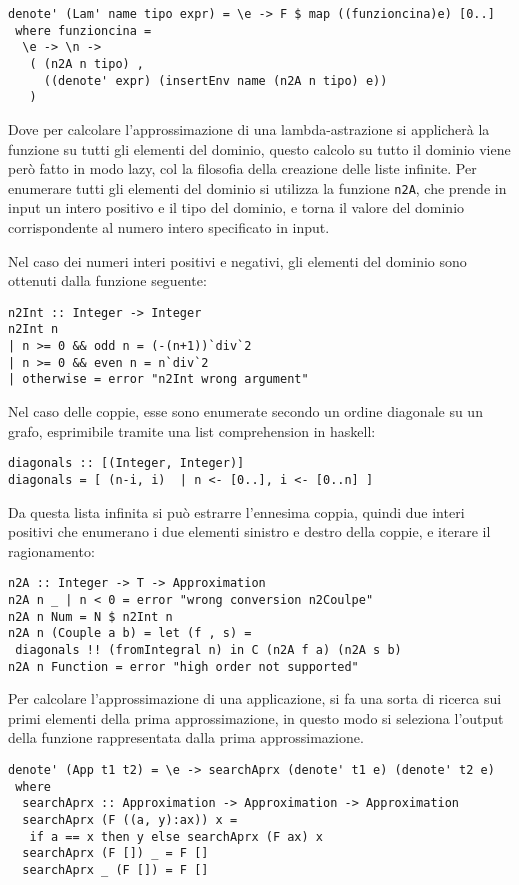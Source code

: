 \documentclass{article}
\begin{document}
\begin{verbatim}
denote' (Lam' name tipo expr) = \e -> F $ map ((funzioncina)e) [0..]
 where funzioncina = 
  \e -> \n -> 
   ( (n2A n tipo) , 
     ((denote' expr) (insertEnv name (n2A n tipo) e)) 
   )
\end{verbatim}

Dove per calcolare l'approssimazione di una lambda-astrazione si applicherà la funzione su tutti gli elementi del dominio, questo calcolo su tutto il dominio viene però fatto in modo lazy, col la filosofia della creazione delle liste infinite.
Per enumerare tutti gli elementi del dominio si utilizza la funzione \texttt{n2A}, che prende in input un intero positivo e il tipo del dominio, e torna il valore del dominio corrispondente al numero intero specificato in input.

Nel caso dei numeri interi positivi e negativi, gli elementi del dominio sono ottenuti dalla funzione seguente:

\begin{verbatim}
n2Int :: Integer -> Integer
n2Int n
| n >= 0 && odd n = (-(n+1))`div`2
| n >= 0 && even n = n`div`2
| otherwise = error "n2Int wrong argument"
\end{verbatim}

Nel caso delle coppie, esse sono enumerate secondo un ordine diagonale su un grafo, esprimibile tramite una list comprehension in haskell:

\begin{verbatim}
diagonals :: [(Integer, Integer)]
diagonals = [ (n-i, i)  | n <- [0..], i <- [0..n] ]
\end{verbatim}

Da questa lista infinita si può estrarre l'ennesima coppia, quindi due interi positivi che enumerano i due elementi sinistro e destro della coppie, e iterare il ragionamento:

\begin{verbatim}
n2A :: Integer -> T -> Approximation
n2A n _ | n < 0 = error "wrong conversion n2Coulpe"
n2A n Num = N $ n2Int n
n2A n (Couple a b) = let (f , s) = 
 diagonals !! (fromIntegral n) in C (n2A f a) (n2A s b)
n2A n Function = error "high order not supported"
\end{verbatim}

Per calcolare l'approssimazione di una applicazione, si fa una sorta di ricerca sui primi elementi della prima approssimazione, in questo modo si seleziona l'output della funzione rappresentata dalla prima approssimazione.
\begin{verbatim}
denote' (App t1 t2) = \e -> searchAprx (denote' t1 e) (denote' t2 e)
 where
  searchAprx :: Approximation -> Approximation -> Approximation
  searchAprx (F ((a, y):ax)) x =
   if a == x then y else searchAprx (F ax) x
  searchAprx (F []) _ = F []
  searchAprx _ (F []) = F []
\end{verbatim}
\end{document}
